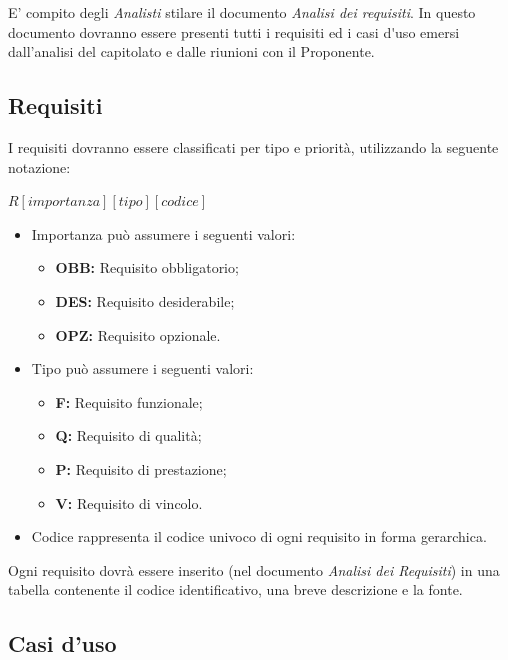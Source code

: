 E' compito degli \textit{Analisti} stilare il documento \textit{Analisi dei requisiti}.
In questo documento dovranno essere presenti tutti i requisiti ed i \gls{casi d'uso} emersi dall'analisi del capitolato e dalle riunioni con il Proponente.\\

\subsection{Requisiti}

I requisiti dovranno essere classificati per tipo e priorità, utilizzando la seguente notazione:

\begin{center}
\begin{math}
R \left [ importanza \right ] \left [ tipo\right ]\left [codice\right ]
\end{math}
\end{center}
\begin{itemize}
  \item Importanza può assumere i seguenti valori:
\begin{itemize}
	\item \textbf{OBB:} Requisito obbligatorio;
	\item \textbf{DES:} Requisito desiderabile;
	\item \textbf{OPZ:} Requisito opzionale.
\end{itemize}
  \item Tipo può assumere i seguenti valori:
\begin{itemize}
	\item \textbf{F:} Requisito funzionale;
	\item \textbf{Q:} Requisito di qualità;
	\item \textbf{P:} Requisito di prestazione;
	\item \textbf{V:} Requisito di vincolo.
\end{itemize}
  \item Codice rappresenta il codice univoco di ogni requisito in forma gerarchica.
\end{itemize}
Ogni requisito dovrà essere inserito (nel documento \textit{Analisi dei Requisiti}) in una tabella contenente il codice identificativo, una breve descrizione e la fonte.

\subsection{Casi d'uso}

